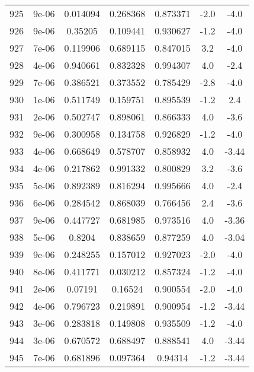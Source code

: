 \begin{table}
\begin{tabular}{c|c|c|c|c|c|c}
925 & 9e-06 & 0.014094 & 0.268368 & 0.873371 & -2.0 & -4.0\\
926 & 9e-06 & 0.35205 & 0.109441 & 0.930627 & -1.2 & -4.0\\
927 & 7e-06 & 0.119906 & 0.689115 & 0.847015 & 3.2 & -4.0\\
928 & 4e-06 & 0.940661 & 0.832328 & 0.994307 & 4.0 & -2.4\\
929 & 7e-06 & 0.386521 & 0.373552 & 0.785429 & -2.8 & -4.0\\
930 & 1e-06 & 0.511749 & 0.159751 & 0.895539 & -1.2 & 2.4\\
931 & 2e-06 & 0.502747 & 0.898061 & 0.866333 & 4.0 & -3.6\\
932 & 9e-06 & 0.300958 & 0.134758 & 0.926829 & -1.2 & -4.0\\
933 & 4e-06 & 0.668649 & 0.578707 & 0.858932 & 4.0 & -3.44\\
934 & 4e-06 & 0.217862 & 0.991332 & 0.800829 & 3.2 & -3.6\\
935 & 5e-06 & 0.892389 & 0.816294 & 0.995666 & 4.0 & -2.4\\
936 & 6e-06 & 0.284542 & 0.868039 & 0.766456 & 2.4 & -3.6\\
937 & 9e-06 & 0.447727 & 0.681985 & 0.973516 & 4.0 & -3.36\\
938 & 5e-06 & 0.8204 & 0.838659 & 0.877259 & 4.0 & -3.04\\
939 & 9e-06 & 0.248255 & 0.157012 & 0.927023 & -2.0 & -4.0\\
940 & 8e-06 & 0.411771 & 0.030212 & 0.857324 & -1.2 & -4.0\\
941 & 2e-06 & 0.07191 & 0.16524 & 0.900554 & -2.0 & -4.0\\
942 & 4e-06 & 0.796723 & 0.219891 & 0.900954 & -1.2 & -3.44\\
943 & 3e-06 & 0.283818 & 0.149808 & 0.935509 & -1.2 & -4.0\\
944 & 3e-06 & 0.670572 & 0.688497 & 0.888541 & 4.0 & -3.44\\
945 & 7e-06 & 0.681896 & 0.097364 & 0.94314 & -1.2 & -3.44\\
\end{tabular}
\end{table}
\newpage
